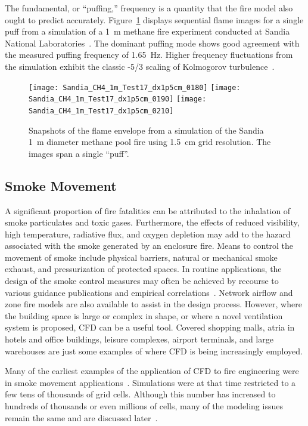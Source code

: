 \documentclass[graybox]{svmult}
\begin{document}
The fundamental, or ``puffing,'' frequency is a quantity that the fire model also ought to predict accurately. Figure~\ref{Sandia_Simulation} displays sequential flame images for a single puff from a simulation of a 1~m methane fire experiment conducted at Sandia National Laboratories~\cite{Tieszen:2002}. The dominant puffing mode shows good agreement with the measured puffing frequency of 1.65~Hz. Higher frequency fluctuations from the simulation exhibit the classic -5/3 scaling of Kolmogorov turbulence~\cite{Pope:2000}.
\begin{figure}[t]
\begin{center}
\texttt{[image: Sandia\_CH4\_1m\_Test17\_dx1p5cm\_0180]}
\texttt{[image: Sandia\_CH4\_1m\_Test17\_dx1p5cm\_0190]}
\texttt{[image: Sandia\_CH4\_1m\_Test17\_dx1p5cm\_0210]}
\end{center}
\caption{Snapshots of the flame envelope from a simulation of the Sandia 1~m diameter methane pool fire using 1.5~cm grid resolution.  The images span a single ``puff''.}
\label{Sandia_Simulation}
\end{figure}



\subsection{Smoke Movement}

A significant proportion of fire fatalities can be attributed to the inhalation of smoke particulates and toxic gases. Furthermore, the effects of reduced visibility, high temperature, radiative flux, and oxygen depletion may add to the hazard associated with the smoke generated by an enclosure fire. Means to control the movement of smoke include physical barriers, natural or mechanical smoke exhaust, and pressurization of protected spaces. In routine applications, the design of the smoke control measures may often be achieved by recourse to various guidance publications and empirical correlations~\cite{Klote, NFPA:92B}. Network airflow and zone fire models are also available to assist in the design process. However, where the building space is large or complex in shape, or where a novel ventilation system is proposed, CFD can be a useful tool. Covered shopping malls, atria in hotels and office buildings, leisure complexes, airport terminals, and large warehouses are just some examples of where CFD is being increasingly employed.

Many  of  the  earliest  examples  of  the  application of CFD to fire engineering were in smoke movement applications~\cite{Pericleous, Cox:1990}. Simulations were at that time restricted to a few tens of thousands of grid cells. Although this number has increased to hundreds of thousands or even millions of cells, many of the modeling issues remain the same and are discussed later~\cite{Kumar}.
\end{document}
